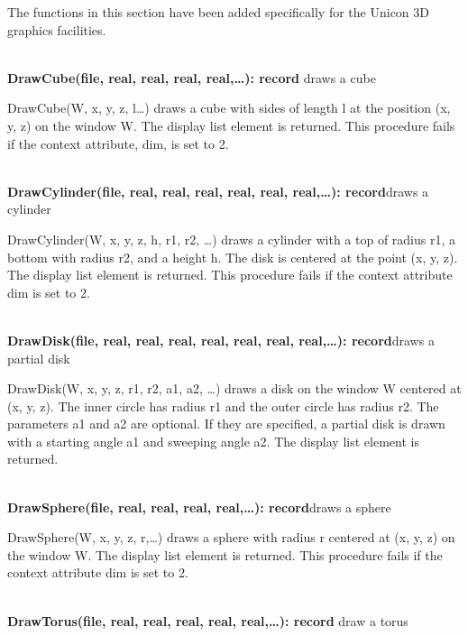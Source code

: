 \documentclass[letterpaper]{article}
\begin{document}
{The functions in this section have been added specifically for the
Unicon 3D graphics facilities.

\noindent\hrulefill\\
\noindent\textsf{\textbf{DrawCube(file, real, real, real, real,{\dots}): record}} \hfill draws a cube


\bigskip

{
\textsf{DrawCube(W, x, y, z, l{\dots}) }draws a cube with sides of length l at the position (x, y, z) on the window W.
The display list element is returned. This procedure fails if the context attribute, dim, is set to 2. }


\noindent\hrulefill\\
\noindent\textsf{\textbf{DrawCylinder(file, real, real, real, real,
real, real,{\dots}): record}}\hfill draws a cylinder}


\bigskip

\textsf{DrawCylinder(W, x, y, z, h, r1, r2, {\dots})} draws a
cylinder with a top of radius r1, a bottom with radius r2, and a
height h. The disk is centered at the point (x, y, z). The display
list element is returned. This procedure fails if the context
attribute dim is set to 2.

\noindent\hrulefill\\
\noindent\textsf{\textbf{DrawDisk(file, real, real, real, real, real,
	real, real,\dots): record}}\hfill draws a partial disk


\bigskip

\textsf{DrawDisk(W, x, y, z, r1, r2, a1, a2, {\dots})} draws
a disk on the window W centered at (x, y, z). The inner circle has
radius r1 and the outer circle has radius r2. The parameters a1 and a2
are optional. If they are specified, a partial disk is drawn with a
starting angle a1 and sweeping angle a2. The display list element is
returned.

\noindent\hrulefill\\
\noindent\textsf{\textbf{DrawSphere(file, real, real, real,
real,{\dots}): record}}\hfill draws a sphere

\textsf{DrawSphere(W, x, y, z, r,{\dots})} draws a sphere with
radius r centered at (x, y, z) on the window W. The display list
element is returned. This procedure fails if the context attribute dim
is set to 2.

\noindent\hrulefill\\
\noindent\textsf{\textbf{DrawTorus(file, real, real, real, real, real,{\dots}): record}}
\hfill draw a torus
\end{document}
